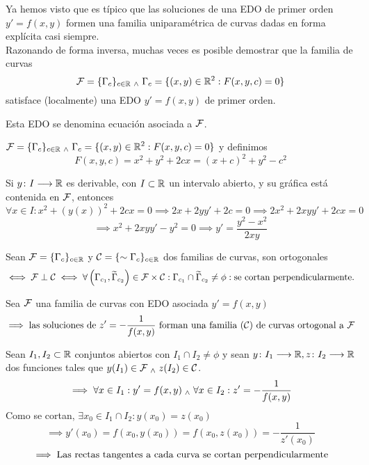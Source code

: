 \documentclass[12pt]{article}
\begin{document}
Ya hemos visto que es típico que las soluciones de una EDO de primer orden $y'=f(x,y)$ formen una familia uniparamétrica de curvas dadas en forma explícita casi siempre. \\
\indent Razonando de forma inversa, muchas veces es posible demostrar que la familia de curvas
\[\mathcal{F} = \{\Gamma_c\}_{c\in \mathbb{R}} \; _{\wedge} \; \Gamma_c=\{(x,y)\in \mathbb{R}^2:F(x,y,c)=0\}\]
satisface (localmente) una EDO $y'=f(x,y)$ de primer orden.
\begin{defn}
    Esta EDO se denomina ecuación asociada a $\mathcal{F}$.
\end{defn}

\begin{ejem} \label{circums}
    $\displaystyle \mathcal{F} = \{\Gamma_c\}_{c\in \mathbb{R}} \; _{\wedge} \; \Gamma_c=\{(x,y)\in \mathbb{R}^2:F(x,y,c)=0\}$ y definimos 
    \[F(x,y,c)=x^2+y^2+2cx=(x+c)^2+y^2-c^2\] \begin{figure}[htbp]
        \centering
        \vspace{-0.7cm} %
        
        \vspace{-0.2cm} %
    \end{figure}
    
    \noindent Si $y \colon I \longrightarrow \mathbb{R}$ es derivable, con $I\subset\mathbb{R}$ un intervalo abierto, y su gráfica está contenida en $\mathcal{F}$, entonces $\forall x \in I : x^2+(y(x))^2+2cx=0 \implies 2x+2yy'+2c=0\implies 2x^2+2xyy'+2cx=0$
    \[\implies x^2+2xyy'-y^2=0 \implies y'=\frac{y^2-x^2}{2xy}\]
\end{ejem}

\begin{defn}
    Sean $\mathcal{F}=\{\Gamma_c\}_{c\in \mathbb{R}}$ y $\mathcal{C}=\{\sim{\Gamma_c}\}_{c\in \mathbb{R}}$ dos familias de curvas, son ortogonales
    \[\iff \mathcal{F} \perp \mathcal{C}\iff \forall \left(\Gamma_{c_1}, \widetilde{\Gamma}_{c_2}\right) \in \mathcal{F}\times\mathcal{C}: \Gamma_{c_1}\cap\widetilde{\Gamma}_{c_2}\ne \phi : \text{se cortan perpendicularmente.}\]
\end{defn}

\begin{prop}
    Sea $\mathcal{F}$ una familia de curvas con EDO asociada $y'=f(x,y)$
    \[\implies \text{las soluciones de } z'=-\frac{1}{f(x,y)} \text{ forman una familia $(\mathcal{C})$ de curvas ortogonal a } \mathcal{F}\]
    \begin{dem}
        Sean $I_1, I_2 \subset \mathbb{R}$ conjuntos abiertos con $I_1\cap I_2\ne \phi$ y sean $y \colon I_1 \longrightarrow \mathbb{R}, z \colon I_2 \longrightarrow \mathbb{R}$ dos funciones tales que $y(I_1)\in \mathcal{F} \; _{\wedge} \; z(I_2)\in \mathcal{C}$.
        \[\implies \forall x\in I_1 : y'=f(x,y) \; _{\wedge} \; \forall x\in I_2 : z'=-\frac{1}{f(x,y)}\]
        Como se cortan, $\exists x_0\in I_1\cap I_2 : y(x_0)=z(x_0)$
        \[\implies y'(x_0)=f(x_0, y(x_0))=f(x_0, z(x_0))=-\frac{1}{z'(x_0)}\]
        \[\implies \text{Las rectas tangentes a cada curva se cortan perpendicularmente}\]
    \end{dem}
\end{prop}
\end{document}
